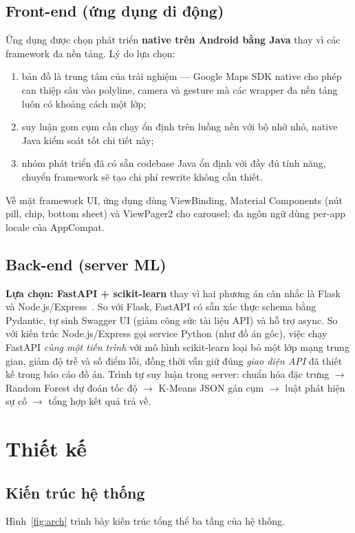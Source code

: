 \subsection{Front-end (ứng dụng di động)}
Ứng dụng được chọn phát triển \textbf{native trên Android bằng Java} thay vì các framework đa nền tảng. Lý do lựa chọn:
\begin{enumerate}[label=(\roman*),leftmargin=2.2cm,itemsep=2pt]
 \item bản đồ là trung tâm của trải nghiệm --- Google Maps SDK native cho phép can thiệp sâu vào polyline, camera và gesture mà các wrapper đa nền tảng luôn có khoảng cách một lớp;
 \item suy luận gom cụm cần chạy ổn định trên luồng nền với bộ nhớ nhỏ, native Java kiểm soát tốt chi tiết này;
 \item nhóm phát triển đã có sẵn codebase Java ổn định với đầy đủ tính năng, chuyển framework sẽ tạo chi phí rewrite không cần thiết.
\end{enumerate}
Về mặt framework UI, ứng dụng dùng ViewBinding, Material Components (nút pill, chip, bottom sheet) và ViewPager2 cho carousel; đa ngôn ngữ dùng per-app locale của AppCompat.

\subsection{Back-end (server ML)}
\textbf{Lựa chọn: FastAPI + scikit-learn} thay vì hai phương án cân nhắc là Flask và Node.js/Express~\cite{tilkov}. So với Flask, FastAPI có sẵn xác thực schema bằng Pydantic, tự sinh Swagger UI (giảm công sức tài liệu API) và hỗ trợ async. So với kiến trúc Node.js/Express gọi service Python (như đồ án gốc), việc chạy FastAPI \textit{cùng một tiến trình} với mô hình scikit-learn loại bỏ một lớp mạng trung gian, giảm độ trễ và số điểm lỗi, đồng thời vẫn giữ đúng \textit{giao diện API} đã thiết kế trong báo cáo đồ án. Trình tự suy luận trong server: chuẩn hóa đặc trưng $\rightarrow$ Random Forest dự đoán tốc độ $\rightarrow$ K-Means JSON gán cụm $\rightarrow$ luật phát hiện sự cố $\rightarrow$ tổng hợp kết quả trả về.

\section{Thiết kế}

\subsection{Kiến trúc hệ thống}
Hình~\ref{fig:arch} trình bày kiến trúc tổng thể ba tầng của hệ thống.

